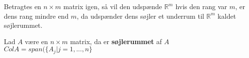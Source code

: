 Betragtes en $n\times m$ matrix igen, så vil den udspænde $\mathds{R}^m$ hvis den rang var $m$, er dens rang mindre end $m$, da udspænder dens søjler et underrum til $\mathds{R}^m$ kaldet søjlerummet.
\begin{defn}[Søjlerum]
Lad $A$ være en $n\times m$ matrix, da er \textbf{søjlerummet} af $A$ $Col A = span(\{A_j | j =1,...,n\}$
\label{def:sojlerum}
\end{defn} 

